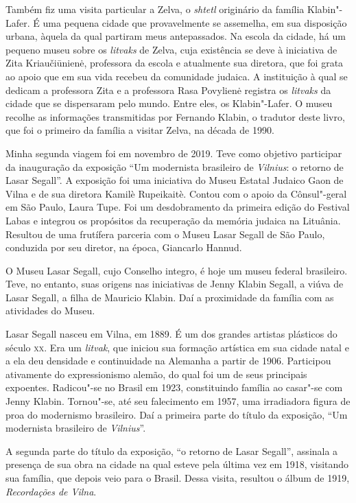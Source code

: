 Também fiz uma visita particular a Zelva, o \textit{shtetl} originário da
família Klabin"-Lafer. É uma pequena cidade que provavelmente se
assemelha, em sua disposição urbana, àquela da qual partiram meus
antepassados. Na escola da cidade, há um pequeno museu sobre os
\textit{litvaks} de Zelva, cuja existência se deve à iniciativa de Zita
Kriaučiūnienė, professora da escola e atualmente sua diretora, que foi
grata ao apoio que em sua vida recebeu da comunidade judaica. A
instituição à qual se dedicam a professora Zita e a professora Rasa
Povylienė registra os \textit{litvaks} da cidade que se dispersaram pelo
mundo. Entre eles, os Klabin"-Lafer. O museu recolhe as informações
transmitidas por Fernando Klabin, o tradutor deste livro, que foi o
primeiro da família a visitar Zelva, na década de 1990.

Minha segunda viagem foi em novembro de 2019. Teve como objetivo
participar da inauguração da exposição ``Um modernista brasileiro de
\textit{Vilnius}: o retorno de Lasar Segall''. A exposição foi uma iniciativa do
Museu Estatal Judaico Gaon de Vilna e de sua diretora Kamilè Rupeikaitè.
Contou com o apoio da Cônsul"-geral em São Paulo, Laura Tupe. Foi um
desdobramento da primeira edição do Festival Labas e integrou os
propósitos da recuperação da memória judaica na Lituânia. Resultou de
uma frutífera parceria com o Museu Lasar Segall de São Paulo, conduzida
por seu diretor, na época, Giancarlo Hannud.

O Museu Lasar Segall, cujo Conselho integro, é hoje um museu federal
brasileiro. Teve, no entanto, suas origens nas iniciativas de Jenny
Klabin Segall, a viúva de Lasar Segall, a filha de Mauricio Klabin. Daí
a proximidade da família com as atividades do Museu.

Lasar Segall nasceu em Vilna, em 1889. É um dos grandes artistas
plásticos do século \textsc{xx}. Era um \textit{litvak}, que iniciou sua formação
artística em sua cidade natal e a ela deu densidade e continuidade na
Alemanha a partir de 1906. Participou ativamente do expressionismo
alemão, do qual foi um de seus principais expoentes. Radicou"-se no
Brasil em 1923, constituindo família ao casar"-se com Jenny Klabin.
Tornou"-se, até seu falecimento em 1957, uma irradiadora figura de proa
do modernismo brasileiro. Daí a primeira parte do título da exposição,
``Um modernista brasileiro de \textit{Vilnius}''.

A segunda parte do título da exposição, ``o retorno de Lasar Segall'',
assinala a presença de sua obra na cidade na qual esteve pela última vez
em 1918, visitando sua família, que depois veio para o Brasil. Dessa
visita, resultou o álbum de 1919, \textit{Recordações de Vilna}.


